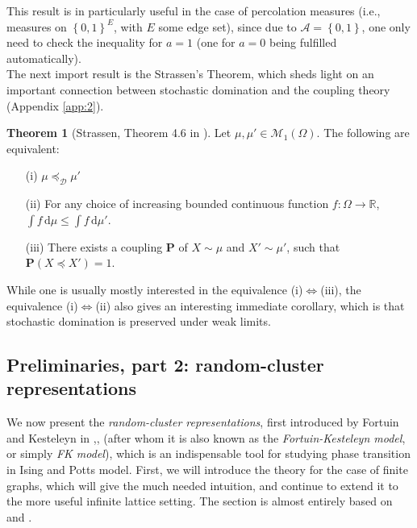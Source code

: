 \documentclass[12pt]{article}
\newcommand{\A}{\mathcal{A}}
\newcommand{\D}{\mathcal{D}}
\renewcommand{\d}{\mathrm{d}}
\newcommand{\M}{\mathcal{M}}
\newcommand{\PP}{\mathbf{P}}
\newcommand{\R}{\mathbb{R}}
\newcommand{\set}[1]{\left\{#1\right\}}
\newcommand{\ra}{\rightarrow}
\newcommand{\1}{\mathbbm{1}}
\newcommand{\5}{\vspace{0.5cm}}
\theoremstyle{definition}
\newtheorem{thm}{Theorem}[section]
\begin{document}
This result is in particularly useful in the case of percolation measures (i.e., measures on $\set{0,1}^E$, with $E$ some edge set), since due to $\A=\set{0,1}$, one only need to check the inequality for $a=1$ (one for $a=0$ being fulfilled automatically). \\

The next import result is the Strassen's Theorem, which sheds light on an important connection between stochastic domination and the coupling theory (Appendix \ref{app:2}). 

\begin{thm}[Strassen, Theorem 4.6 in \cite{GHM}]
Let $\mu,\mu'\in\M_1(\Omega)$. The following are equivalent:
\begin{itemize}
	\item[(i)] $\mu\preceq_\D\mu'$
	\item[(ii)] For any choice of increasing bounded continuous function $f:\Omega\ra\R$, $\int f\,\d\mu\leq \int f\,\d\mu'$.
	\item[(iii)] There exists a coupling $\PP$ of $X\sim\mu$ and $X'\sim\mu'$, such that $\PP(X\preceq X')=1$.
\end{itemize}
\end{thm}

While one is usually mostly interested in the equivalence (i)$\Leftrightarrow$(iii), the equivalence (i)$\Leftrightarrow$(ii) also gives an interesting immediate corollary, which is that stochastic domination is preserved under weak limits.


\subsection{Preliminaries, part 2: random-cluster representations}\label{sec:RandomCluster}

We now present the \textit{random-cluster representations}, first introduced by Fortuin and Kesteleyn in \cite{FK},\cite{For1},\cite{For2} (after whom it is also known as the \textit{Fortuin-Kesteleyn model}, or simply \textit{FK model}), which is an indispensable tool for studying phase transition in Ising and Potts model. First, we will introduce the theory for the case of finite graphs, which will give the much needed intuition, and continue to extend it to the more useful infinite lattice setting. The section is almost entirely based on \cite{GHM} and \cite{Gri}.
\end{document}
